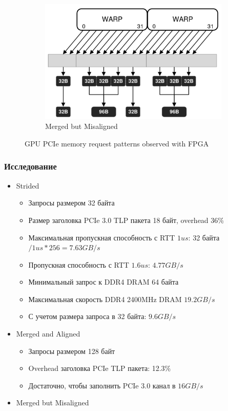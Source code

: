 \documentclass[xcolor=table,english]{beamer}
\begin{document}
\begin{frame}[fragile]
\begin{minipage}[m]{1.0\linewidth}
\begin{figure}
\begin{subfigure}[b]{0.3\textwidth}
                \includegraphics[width=\textwidth]{figures/merged_misaligned_access.png}
                \caption{Merged but Misaligned}
            \end{subfigure}
            \caption{GPU PCIe memory request patterns observed with FPGA}
        \end{figure}
    \end{minipage}\hfill
\end{frame}

\begin{frame}[fragile] \frametitle{Исследование}
    \begin{itemize}
        \item Strided
        {
            \begin{itemize}
                \item Запросы размером 32 байта
                \item Размер заголовка PCIe 3.0 TLP пакета 18 байт, overhead 36\%
                \item Максимальная пропускная способность с RTT $1us$: 
                32 байта $/ 1us * 256 = 7.63 GB/s$ 
                \item Пропускная способность с RTT $1.6us$: $4.77GB/s$
                \item Минимальный запрос к DDR4 DRAM 64 байта
                \item Максимальная скорость DDR4 2400MHz DRAM $19.2GB/s$
                \item С учетом размера запроса в 32 байта: $9.6GB/s$
            \end{itemize}
        }
        \item Merged and Aligned
        {
            \begin{itemize}
                \item Запросы размером 128 байт
                \item Overhead заголовка PCIe TLP пакета: 12.3\%
                \item Достаточно, чтобы заполнить PCIe 3.0 канал в $16GB/s$ 
            \end{itemize}
        }
        \item Merged but Misaligned
        {
        }
    \end{itemize}
\end{frame}
\end{document}
